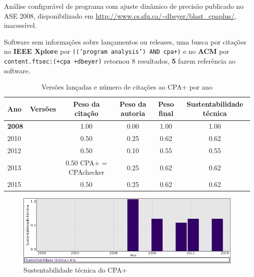 Análise configurável de programa com ajuste dinâmico de precisão
publicado no ASE 2008,
disponibilizado em \url{http://www.cs.sfu.ca/~dbeyer/blast_cpaplus/},
inacessível.

Software sem informações sobre lançamentos ou releases,
uma busca por citações no {\bf IEEE Xplore} por
\texttt{(('program analysis') AND cpa+)}
e no {\bf ACM} por
\texttt{content.ftsec:(+cpa +dbeyer)}
retornou
8 resultados,
{\bf 5} fazem referência ao software.


\begin{table}[H]
\caption{Versões lançadas e número de citações ao CPA+ por ano}
\centering
\begin{tabular}{| l | c | c | c | c | c |}
  \hline
  Ano & Versões & Peso da citação & Peso da autoria & Peso final & Sustentabilidade técnica \\
  \hline
            {\bf 2008}
          &
          
          &
          1.00
          &
          0.00
          &
          1.00
          &
            {\color{blue} 1.00}
          \\
\hline
            2010
          &
          
          &
          0.50
          &
          0.25
          &
          0.62
          &
            {\color{blue} 0.62}
          \\
\hline
            2012
          &
          
          &
          0.50
          &
          0.10
          &
          0.55
          &
            {\color{blue} 0.55}
          \\
\hline
            2013
          &
          
          &
          0.50
            {\tiny CPA+ = CPAchecker}
          &
          0.25
          &
          0.62
          &
            {\color{blue} 0.62}
          \\
\hline
            2015
          &
          
          &
          0.50
          &
          0.25
          &
          0.62
          &
            {\color{blue} 0.62}
          \\
\hline
\end{tabular}
\end{table}

\begin{figure}[h]
  \center
  \includegraphics[scale=0.50]{result-documents/charts/cpa+.png}
  \caption{Sustentabilidade técnica do CPA+}
\end{figure}


